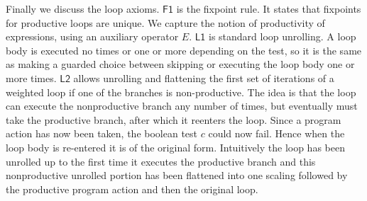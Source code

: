 \documentclass[a4paper,UKenglish,cleveref, autoref, thm-restate]{lipics-v2021}
\newcommand{\Ax}[1]{\ensuremath{\mathsf{#1}}}
\theoremstyle{plain}\newtheoremrep{thm}{Theorem}[section]
\begin{document}
	Finally we discuss the loop axioms. \Ax{F1} is the fixpoint rule. It states that fixpoints for productive loops are unique. We capture the notion of productivity of expressions, using an auxiliary operator $E$. \Ax{L1} is standard loop unrolling. A loop body is executed no times or one or more depending on the test, so it is the same as making a guarded choice between skipping or executing the loop body one or more times. \Ax{L2} allows unrolling and flattening the first set of iterations of a weighted loop if one of the branches is non-productive. The idea is that the loop can execute the nonproductive branch any number of times, but eventually must take the productive branch, after which it reenters the loop. Since a program action has now been taken, the boolean test $c$ could now fail. Hence when the loop body is re-entered it is of the original form. Intuitively the loop has been unrolled up to the first time it executes the productive branch and this nonproductive unrolled portion has been flattened into one scaling followed by the productive program action and then the original loop. 
\end{document}
